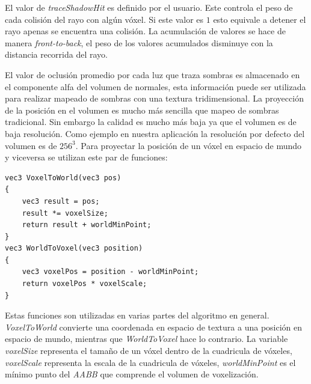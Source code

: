 El valor de \emph{traceShadowHit} es definido por el usuario. Este controla el peso de cada colisión del rayo con algún vóxel. Si este valor es $1$ esto equivale a detener el rayo apenas se encuentra una colisión. La acumulación de valores se hace de manera \emph{front-to-back}, el peso de los valores acumulados disminuye con la distancia recorrida del rayo.

El valor de oclusión promedio por cada luz que traza sombras es almacenado en el componente alfa del volumen de normales, esta información puede ser utilizada para realizar mapeado de sombras con una textura tridimensional. La proyección de la posición en el volumen es mucho más sencilla que mapeo de sombras tradicional. Sin embargo la calidad es mucho más baja ya que el volumen es de baja resolución. Como ejemplo en nuestra aplicación la resolución por defecto del volumen es de $256^3$. Para proyectar la posición de un vóxel en espacio de mundo y viceversa se utilizan este par de funciones:
\\
\begin{lstlisting}[caption={Transformación de espacio entre coordenadas de textura y posiciones de mundo.}, label=SpaceTransform]
vec3 VoxelToWorld(vec3 pos)
{
	vec3 result = pos;
	result *= voxelSize;
	return result + worldMinPoint;
}
vec3 WorldToVoxel(vec3 position)
{
    vec3 voxelPos = position - worldMinPoint;
    return voxelPos * voxelScale;
}
\end{lstlisting}

Estas funciones son utilizadas en varias partes del algoritmo en general. \emph{VoxelToWorld} convierte una coordenada en espacio de textura a una posición en espacio de mundo, mientras que \emph{WorldToVoxel} hace lo contrario. La variable \emph{voxelSize} representa el tamaño de un vóxel dentro de la cuadricula de vóxeles, \emph{voxelScale} representa la escala de la cuadricula de vóxeles, \emph{worldMinPoint} es el mínimo punto del \emph{AABB} que comprende el volumen de voxelización.

